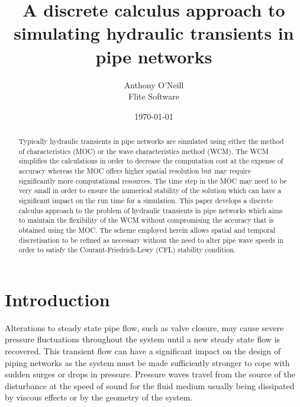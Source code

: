 \documentclass[12pt]{article}
\title{A discrete calculus approach to simulating hydraulic transients in pipe networks}
\author{Anthony O'Neill  \\
	Flite Software  \\
	}
\date{\today}
\begin{document}

\maketitle

\begin{abstract}
Typically hydraulic transients in pipe networks are simulated using either the method of characteristics (MOC) or the wave characteristics method (WCM). The WCM simplifies the calculations in order to decrease the computation cost at the expense of accuracy whereas the MOC offers higher spatial resolution but may require significantly more computational resources. The time step in the MOC may need to be very small in order to ensure the numerical stability of the solution which can have a significant impact on the run time for a simulation. This paper develops a discrete calculus approach to the problem of hydraulic transients in pipe networks which aims to maintain the flexibility of the WCM without compromising the accuracy that is obtained using the MOC. The scheme employed herein allows spatial and temporal discretisation to be refined as necessary without the need to alter pipe wave speeds in order to satisfy the Courant-Friedrich-Lewy (CFL) stability condition.
\end{abstract}

\section{Introduction} \label{sec:introduction}

Alterations to steady state pipe flow, such as valve closure, may cause severe pressure fluctuations throughout the system until a new steady state flow is recovered. This transient flow can have a significant impact on the design of piping networks as the system must be made sufficiently stronger to cope with sudden surges or drops in pressure. Pressure waves travel from the source of the disturbance at the speed of sound for the fluid medium usually being dissipated by viscous effects or by the geometry of the system. 
\end{document}
